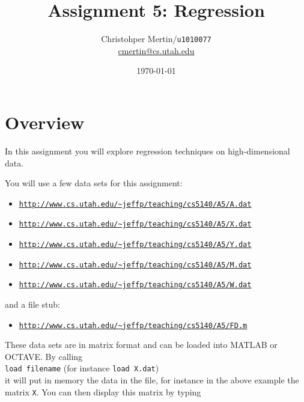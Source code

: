 \documentclass[11pt]{article}
\title{Assignment 5: Regression}
\author{Christohper Mertin/\verb~u1010077~\\
        \url{cmertin@cs.utah.edu}}
\date{\today}
\begin{document}
\maketitle





\section*{Overview}

In this assignment you will explore regression techniques on high-dimensional data.  

You will use a few data sets for this assignment:
\begin{itemize} \denselist
\item \href{http://www.cs.utah.edu/~jeffp/teaching/cs5140/A5/A.dat}{\texttt{http://www.cs.utah.edu/\~{}jeffp/teaching/cs5140/A5/A.dat}}
\item \href{http://www.cs.utah.edu/~jeffp/teaching/cs5140/A5/X.dat}{\texttt{http://www.cs.utah.edu/\~{}jeffp/teaching/cs5140/A5/X.dat}}
\item \href{http://www.cs.utah.edu/~jeffp/teaching/cs5140/A5/Y.dat}{\texttt{http://www.cs.utah.edu/\~{}jeffp/teaching/cs5140/A5/Y.dat}}
\item \href{http://www.cs.utah.edu/~jeffp/teaching/cs5140/A5/M.dat}{\texttt{http://www.cs.utah.edu/\~{}jeffp/teaching/cs5140/A5/M.dat}}
\item \href{http://www.cs.utah.edu/~jeffp/teaching/cs5140/A5/W.dat}{\texttt{http://www.cs.utah.edu/\~{}jeffp/teaching/cs5140/A5/W.dat}}
\end{itemize}
and a file stub:
\begin{itemize} \denselist
\item \href{http://www.cs.utah.edu/~jeffp/teaching/cs5140/A5/FD.m}{\texttt{http://www.cs.utah.edu/\~{}jeffp/teaching/cs5140/A5/FD.m}}
\end{itemize}

These data sets are in matrix format and can be loaded into MATLAB or OCTAVE.  By calling 
\\
\texttt{load filename} (for instance \texttt{load X.dat})
\\
it will put in memory the data in the file, for instance in the above example the matrix \texttt{X}.  You can then display this matrix by typing 
\end{document}
